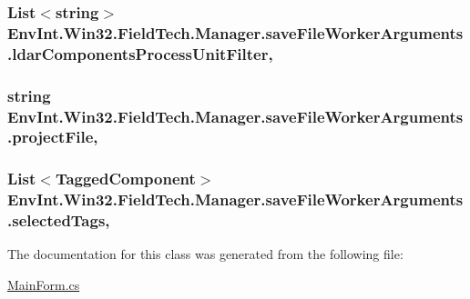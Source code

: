 \subsubsection[{ldar\+Components\+Process\+Unit\+Filter}]{\setlength{\rightskip}{0pt plus 5cm}List$<$string$>$ Env\+Int.\+Win32.\+Field\+Tech.\+Manager.\+save\+File\+Worker\+Arguments.\+ldar\+Components\+Process\+Unit\+Filter\hspace{0.3cm}{\ttfamily [get]}, {\ttfamily [set]}}\label{class_env_int_1_1_win32_1_1_field_tech_1_1_manager_1_1save_file_worker_arguments_a00b50594c98505075f2e22e3cd930be0}
\hypertarget{class_env_int_1_1_win32_1_1_field_tech_1_1_manager_1_1save_file_worker_arguments_a789eaf667d1c6a1d6d26b38e38618551}{}
\subsubsection[{project\+File}]{\setlength{\rightskip}{0pt plus 5cm}string Env\+Int.\+Win32.\+Field\+Tech.\+Manager.\+save\+File\+Worker\+Arguments.\+project\+File\hspace{0.3cm}{\ttfamily [get]}, {\ttfamily [set]}}\label{class_env_int_1_1_win32_1_1_field_tech_1_1_manager_1_1save_file_worker_arguments_a789eaf667d1c6a1d6d26b38e38618551}
\hypertarget{class_env_int_1_1_win32_1_1_field_tech_1_1_manager_1_1save_file_worker_arguments_a5f9698f03ccd644ebc76232f58d9e1df}{}
\subsubsection[{selected\+Tags}]{\setlength{\rightskip}{0pt plus 5cm}List$<$Tagged\+Component$>$ Env\+Int.\+Win32.\+Field\+Tech.\+Manager.\+save\+File\+Worker\+Arguments.\+selected\+Tags\hspace{0.3cm}{\ttfamily [get]}, {\ttfamily [set]}}\label{class_env_int_1_1_win32_1_1_field_tech_1_1_manager_1_1save_file_worker_arguments_a5f9698f03ccd644ebc76232f58d9e1df}


The documentation for this class was generated from the following file\+:\begin{DoxyCompactItemize}
\item 
\hyperlink{_main_form_8cs}{Main\+Form.\+cs}\end{DoxyCompactItemize}
